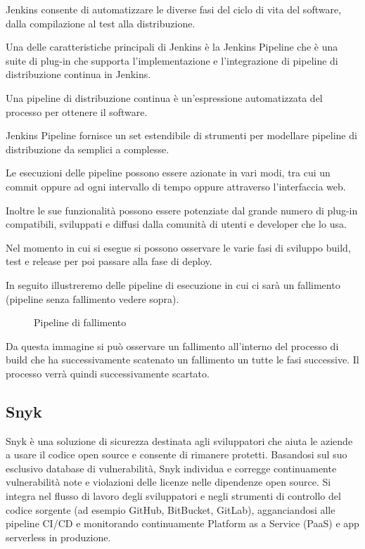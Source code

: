 Jenkins consente di automatizzare le diverse fasi del ciclo di vita del software, dalla compilazione al test alla distribuzione.

Una delle caratteristiche principali di Jenkins è la Jenkins Pipeline che è una suite di plug-in che supporta l'implementazione e l'integrazione di pipeline di distribuzione continua in Jenkins.

Una pipeline di distribuzione continua è un'espressione automatizzata del processo per ottenere il software.

Jenkins Pipeline fornisce un set estendibile di strumenti per modellare pipeline di distribuzione da semplici a complesse. 

Le esecuzioni delle pipeline possono essere azionate in vari modi, tra cui un commit oppure ad ogni intervallo di tempo oppure attraverso l'interfaccia web. 

Inoltre le sue funzionalità possono essere potenziate dal grande numero di plug-in compatibili, sviluppati e diffusi dalla comunità di utenti e developer che lo usa.

Nel momento in cui si esegue si possono osservare le varie fasi di sviluppo build, test e release per poi passare alla fase di deploy. 

In seguito illustreremo delle pipeline di esecuzione in cui ci sarà un fallimento (pipeline senza fallimento vedere sopra). 
\begin{figure}[H]
    \caption{Pipeline di fallimento}
    \label{fig:pipelineIns}
\end{figure}
Da questa immagine si può osservare un fallimento all’interno del processo di build che ha successivamente scatenato un fallimento un tutte le fasi successive. Il processo verrà quindi successivamente scartato.
\cite{Jenkins}
\subsection{Snyk}
Snyk è una soluzione di sicurezza destinata agli sviluppatori che aiuta le aziende a usare il codice open source e consente di rimanere protetti. Basandosi sul suo esclusivo database di vulnerabilità, Snyk individua e corregge continuamente vulnerabilità note e violazioni delle licenze nelle dipendenze open source. Si integra nel flusso di lavoro degli sviluppatori e negli strumenti di controllo del codice sorgente (ad esempio GitHub, BitBucket, GitLab), agganciandosi alle pipeline CI/CD e monitorando continuamente Platform as a Service (PaaS) e app serverless in produzione.

